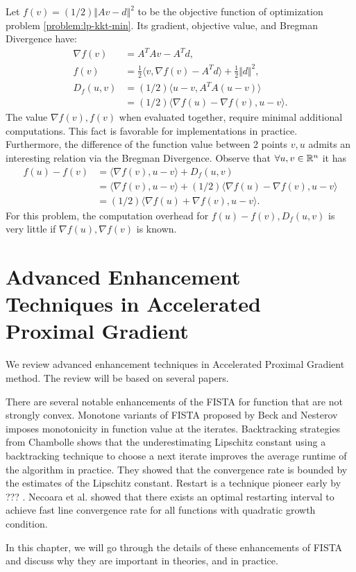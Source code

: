 \documentclass[12pt]{report}
\begin{document}
            Let $f(v) = (1/2)\Vert Av - d\Vert^2$ to be the objective function of optimization problem \eqref{problem:lp-kkt-min}. 
            Its gradient, objective value, and Bregman Divergence have: 
            \begin{align*}
                \nabla f(v) &= A^TAv - A^Td, 
                \\
                f(v) &= 
                \frac{1}{2}\langle v, \nabla f(v) - A^Td\rangle + \frac{1}{2}\Vert d\Vert^2, 
                \\
                D_f(u, v) &= (1/2)\langle u - v, A^TA (u - v)\rangle
                \\
                &= (1/2)\langle \nabla f(u) - \nabla f(v), u - v\rangle. 
            \end{align*}
            The value $\nabla f(v), f(v)$ when evaluated together, require minimal additional computations. 
            This fact is favorable for implementations in practice. 
            Furthermore, the difference of the function value between 2 points $v, u$ admits an interesting relation via the Bregman Divergence. 
            Observe that $\forall u, v \in \mathbb R^n$ it has 
            \begin{align*}
                f(u) - f(v) &= \langle \nabla f(v), u - v \rangle + D_f(u, v)
                \\
                &= \langle \nabla f(v), u - v \rangle + (1/2)\langle \nabla f(u) - \nabla f(v), u - v\rangle
                \\
                &= (1/2)\langle \nabla f(u) + \nabla f(v), u - v\rangle. 
            \end{align*}
            For this problem, the computation overhead for $f(u) - f(v), D_f(u, v)$ is very little if $\nabla f(u), \nabla f(v)$ is known. 

\chapter{Advanced Enhancement Techniques in Accelerated Proximal Gradient}
    We review advanced enhancement techniques in Accelerated Proximal Gradient method. 
    The review will be based on several papers. 
    \par
    There are several notable enhancements of the FISTA for function that are not strongly convex. 
    Monotone variants of FISTA proposed by Beck \todo{[?]} and Nesterov \todo{[?]} imposes monotonicity in function value at the iterates.  
    Backtracking strategies from Chambolle \todo{[?]} shows that the underestimating Lipschitz constant using a backtracking technique to choose a next iterate improves the average runtime of the algorithm in practice. 
    They showed that the convergence rate is bounded by the estimates of the Lipschitz constant. 
    Restart is a technique pioneer early by ??? \todo{[?]}. 
    Necoara et al. \cite{necoara_linear_2019} showed that there exists an optimal restarting interval to achieve fast line convergence rate for all functions with quadratic growth condition. 
    \par
    In this chapter, we will go through the details of these enhancements of FISTA and discuss why they are important in theories, and in practice. 
\end{document}
